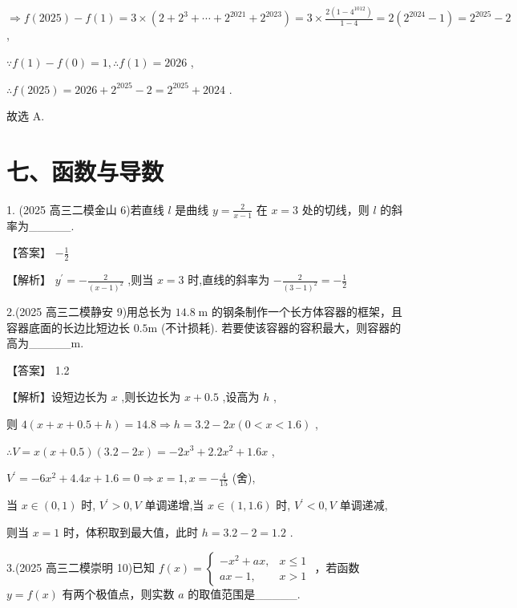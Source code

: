 \documentclass[10pt]{article}
\begin{document}
\(\Rightarrow  f\left( {2025}\right)  - f\left( 1\right)  = 3 \times  \left( {2 + {2}^{3} + \cdots  + {2}^{2021} + {2}^{2023}}\right)  = 3 \times  \frac{2\left( {1 - {4}^{1012}}\right) }{1 - 4} = 2\left( {{2}^{2024} - 1}\right)  = {2}^{2025} - 2\) ,

\(\because f\left( 1\right)  - f\left( 0\right)  = 1,\therefore f\left( 1\right)  = {2026}\) ,

\(\therefore f\left( {2025}\right)  = {2026} + {2}^{2025} - 2 = {2}^{2025} + {2024}\) .

故选 A.

\section*{七、函数与导数}

1. (2025 高三二模金山 6)若直线 \(l\) 是曲线 \(y = \frac{2}{x - 1}\) 在 \(x = 3\) 处的切线，则 \(l\) 的斜率为\_\_\_\_\_.

【答案】 \(- \frac{1}{2}\)

【解析】 \({y}^{\prime } =  - \frac{2}{{\left( x - 1\right) }^{2}}\) ,则当 \(x = 3\) 时,直线的斜率为 \(- \frac{2}{{\left( 3 - 1\right) }^{2}} =  - \frac{1}{2}\)

2.(2025 高三二模静安 9)用总长为 \({14.8}\mathrm{\;m}\) 的钢条制作一个长方体容器的框架，且容器底面的长边比短边长 \({0.5}\mathrm{m}\) (不计损耗). 若要使该容器的容积最大，则容器的高为\_\_\_\_\_m.

【答案】 1.2

【解析】设短边长为 \(x\) ,则长边长为 \(x + {0.5}\) ,设高为 \(h\) ,

则 \(4\left( {x + x + {0.5} + h}\right)  = {14.8} \Rightarrow  h = {3.2} - {2x}\left( {0 < x < {1.6}}\right)\) ,

\(\therefore V = x\left( {x + {0.5}}\right) \left( {{3.2} - {2x}}\right)  =  - 2{x}^{3} + {2.2}{x}^{2} + {1.6x}\) ,

\({V}^{\prime } =  - 6{x}^{2} + {4.4x} + {1.6} = 0 \Rightarrow  x = 1,x =  - \frac{4}{15}\) (舍),

当 \(x \in  \left( {0,1}\right)\) 时, \({V}^{\prime } > 0,V\) 单调递增,当 \(x \in  \left( {1,{1.6}}\right)\) 时, \({V}^{\prime } < 0,V\) 单调递减,

则当 \(x = 1\) 时，体积取到最大值，此时 \(h = {3.2} - 2 = {1.2}\) .

3.(2025 高三二模崇明 10)已知 \(f\left( x\right)  = \left\{  \begin{array}{ll}  - {x}^{2} + {ax}, & x \leq  1 \\  {ax} - 1, & x > 1 \end{array}\right.\) ，若函数 \(y = f\left( x\right)\) 有两个极值点，则实数 \(a\) 的取值范围是\_\_\_\_\_.
\end{document}
